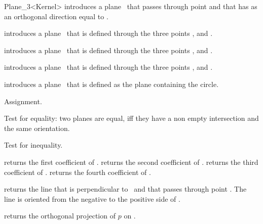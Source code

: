 \begin{ccRefClass} {Plane_3<Kernel>}
{introduces a plane \ccVar\ that passes through point  and
 that has as an orthogonal direction equal to .}

{introduces a plane \ccVar\ that is defined through the  three points 
 ,  and .}

{introduces a plane \ccVar\ that is defined through the  three points 
 ,  and .}

{introduces a plane \ccVar\ that is defined through the  three points 
 ,  and .}

{introduces a plane \ccVar\ that is defined as the plane containing
  the circle.}

\ccOperations
\ccHidden {}
        {Assignment.}

       {Test for equality: two planes are equal, iff they have a non 
        empty intersection and the same orientation.}

       {Test for inequality.}

       {returns the first coefficient of \ccVar.}
\ccGlue
{}
       {returns the second coefficient of \ccVar.}
\ccGlue
{}
       {returns the third coefficient of \ccVar.}
\ccGlue
{}
       {returns the fourth coefficient of \ccVar.}

       {returns the line that is perpendicular to \ccVar\ and that
        passes through point . The line is oriented from
        the negative to the positive side of \ccVar.}

       {returns the orthogonal projection of $p$ on \ccVar.}


\end{ccRefClass}
